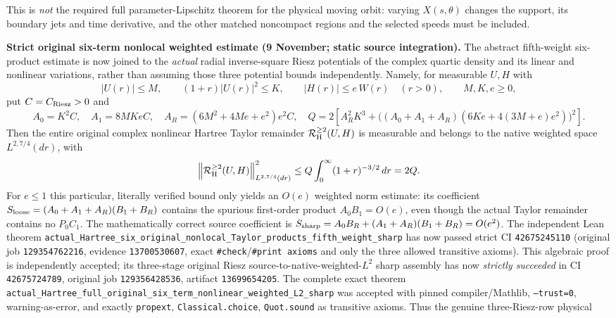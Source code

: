 \documentclass[11pt]{amsart}
\begin{document}
This is \emph{not} the required full parameter-Lipschitz theorem
for the physical moving orbit: varying $X(s,\theta)$ changes the
support, its boundary jets and time derivative, and the other
matched noncompact regions and the selected speeds must be included.




\medskip
\noindent\textbf{Strict original six-term nonlocal weighted estimate
(9 November; static source integration).}
The abstract fifth-weight six-product estimate is now joined to the
\emph{actual} radial inverse-square Riesz potentials of the complex
quartic density and its linear and nonlinear variations, rather than
assuming those three potential bounds independently.  Namely, for
measurable $U,H$ with
\[
 |U(r)|\le M,\qquad (1+r)|U(r)|^2\le K,\qquad
 |H(r)|\le e\,W(r)\quad (r>0),\qquad M,K,e\ge0,
\]
put $C=C_{\rm Riesz}>0$ and
\[
 A_0=K^2C,\quad A_1=8MKeC,\quad
 A_R=(6M^2+4Me+e^2)e^2C,\quad
 Q=2\left[
 A_R^2K^3+
 \bigl((A_0+A_1+A_R)(6Ke+4(3M+e)e^2)\bigr)^2\right].
\]
Then the entire original complex nonlinear Hartree Taylor remainder
$\mathcal R_{\rm H}^{\ge2}(U,H)$ is measurable and belongs to the
native weighted space $L^{2,7/4}(dr)$, with
\[
 \left\|\mathcal R_{\rm H}^{\ge2}(U,H)
 \right\|_{L^{2,7/4}(dr)}^2
 \le Q\int_0^\infty(1+r)^{-3/2}\,dr=2Q.
\]
For $e\le1$ this particular, literally verified bound only yields
an $O(e)$ weighted norm estimate: its coefficient
$S_{\rm loose}=(A_0+A_1+A_R)(B_1+B_R)$ contains the spurious
first-order product $A_0B_1=O(e)$, even though the actual Taylor
remainder contains no $P_0C_1$.  The mathematically correct source
coefficient is
$S_{\rm sharp}=A_0B_R+(A_1+A_R)(B_1+B_R)=O(e^2)$.
The independent Lean theorem
\texttt{actual\_Hartree\_six\_original\_nonlocal\_Taylor\_products\_fifth\_weight\_sharp}
has now passed strict CI \texttt{42675245110} (original job
\texttt{129354762216}, evidence \texttt{13700530607}, exact
\texttt{\#check}/\texttt{\#print axioms} and only the three allowed
transitive axioms).  This algebraic proof is independently accepted;
its three-stage original Riesz source-to-native-weighted-$L^2$ sharp
assembly has now \emph{strictly succeeded} in CI \texttt{42675724789},
original job \texttt{129356428536}, artifact \texttt{13699654205}.
The complete exact theorem
\texttt{actual\_Hartree\_full\_original\_six\_term\_nonlinear\_weighted\_L2\_sharp}
was accepted with pinned compiler/Mathlib, \texttt{--trust=0},
warning-as-error, and exactly
\texttt{propext}, \texttt{Classical.choice}, \texttt{Quot.sound}
as transitive axioms.  Thus the genuine three-Riesz-row physical
\end{document}
